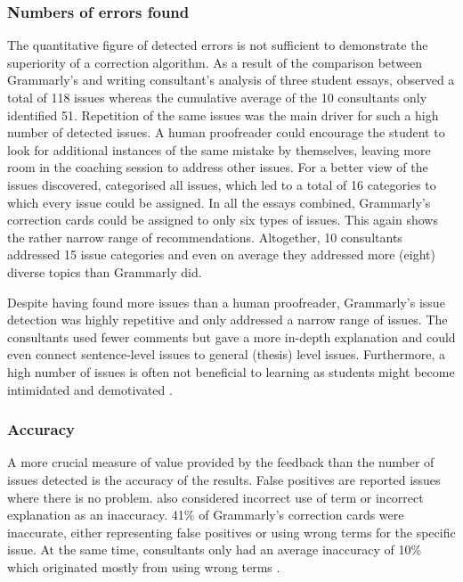 \documentclass[runningheads]{llncs}
\let\OldTextregistered\textregistered
\renewcommand{\textregistered}{\OldTextregistered\xspace}
\begin{document}
\subsubsection{Numbers of errors found}
The quantitative figure of detected errors is not sufficient to demonstrate the superiority of a correction algorithm. As a result of the comparison between Grammarly\textregistered's and writing consultant's analysis of three student essays, \textcite{dembsey_closing_2017} observed a total of 118 issues whereas the cumulative average of the 10 consultants only identified 51. Repetition of the same issues was the main driver for such a high number of detected issues. A human proofreader could encourage the student to look for additional instances of the same mistake by themselves, leaving more room in the coaching session to address other issues. For a better view of the issues discovered, \citeauthor{dembsey_closing_2017} categorised all issues, which led to a total of 16 categories to which every issue could be assigned. In all the essays combined, Grammarly\textregistered's correction cards could be assigned to only six types of issues. This again shows the rather narrow range of recommendations. Altogether, 10 consultants addressed 15 issue categories and even on average they addressed more (eight) diverse topics than Grammarly\textregistered did.

Despite having found more issues than a human proofreader, Grammarly\textregistered's issue detection was highly repetitive and only addressed a narrow range of issues. The consultants used fewer comments but gave a more in-depth explanation and could even connect sentence-level issues to general (thesis) level issues. Furthermore, a high number of issues is often not beneficial to learning as students might become intimidated and demotivated \citep{dembsey_closing_2017}.


\subsubsection{Accuracy}
A more crucial measure of value provided by the feedback than the number of issues detected is the accuracy of the results. False positives are reported issues where there is no problem. \textcite{dembsey_closing_2017} also considered incorrect use of term or incorrect explanation as an inaccuracy. 41\% of Grammarly\textregistered's correction cards were inaccurate, either representing false positives or using wrong terms for the specific issue. At the same time, consultants only had an average inaccuracy of 10\% which originated mostly from using wrong terms \citep{dembsey_closing_2017}.
\end{document}
